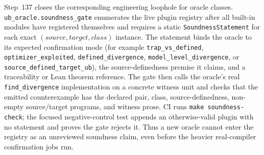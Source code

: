 \documentclass[10pt,a4paper]{article}
\begin{document}
Step~137 closes the corresponding engineering loophole for oracle classes.
\texttt{ub\_oracle.soundness\_gate} enumerates the live plugin registry after all
built-in modules have registered themselves and requires a static
\texttt{SoundnessStatement} for each exact
\((\mathit{source},\mathit{target},\mathit{class})\) instance.  The statement
binds the oracle to its expected confirmation mode (for example
\texttt{trap\_vs\_defined}, \texttt{optimizer\_exploited},
\texttt{defined\_divergence}, \texttt{model\_level\_divergence}, or
\texttt{source\_defined\_target\_ub}), the source-definedness premise it claims,
and a traceability or Lean theorem reference.  The gate then calls the oracle's
real \texttt{find\_divergence} implementation on a concrete witness unit and
checks that the emitted counterexample has the declared pair, class,
source-definedness, non-empty source/target programs, and witness prose.  CI runs
\texttt{make soundness-check}; the focused negative-control test appends an
otherwise-valid plugin with no statement and proves the gate rejects it.  Thus a
new oracle cannot enter the registry as an unreviewed soundness claim, even before
the heavier real-compiler confirmation jobs run.
\end{document}
